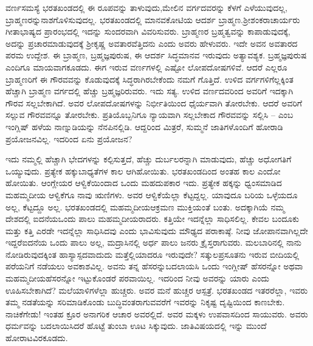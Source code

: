 ವರ್ಣಸಮಸ್ಯೆ ಭರತಖಂಡದಲ್ಲಿ ಈ ರೂಪವನ್ನು ತಾಳುವುದು,\break ಮೇಲಿನ ವರ್ಗದವರನ್ನು ಕೆಳಗೆ ಎಳೆಯುವುದಲ್ಲ, ಬ್ರಾಹ್ಮಣರನ್ನು\break ನಾಶಗೊಳಿಸುವುದಲ್ಲ. ಭರತಖಂಡದಲ್ಲಿ ಮಾನವಕೋಟಿಯ ಆದರ್ಶ ಬ್ರಾಹ್ಮಣ.\break ಶ‍್ರೀಶಂಕರಾಚಾರ್ಯರು ಗೀತಾಭಾಷ್ಯದ ಪ್ರಾರಂಭದಲ್ಲಿ ಇದನ್ನು ಸುಂದರವಾಗಿ ವಿವರಿಸುವರು. ಬ್ರಾಹ್ಮಣರ ಬ್ರಹ್ಮತ್ವವನ್ನು ಕಾಪಾಡುವುದಕ್ಕೆ, ಅದನ್ನು ಪ್ರಚಾರಮಾಡುವುದಕ್ಕೆ ಶ‍್ರೀಕೃಷ್ಣ ಅವತಾರವೆತ್ತಿದನು ಎಂದು ಅವರು ಹೇಳುವರು. ಇದೇ ಅವನ ಅವತಾರದ ಪರಮ ಉದ್ದೇಶ. ಈ ಬ್ರಾಹ್ಮಣ, ಬ್ರಹ್ಮಜ್ಞಪುರುಷ, ಈ ಆದರ್ಶ ಸಿದ್ಧಮಾನವ ಇರುವುದು ಅತ್ಯಾವಶ್ಯಕ. ಬ್ರಹ್ಮಜ್ಞಪುರುಷ ಎಂದಿಗೂ ಮಾಯವಾಗಕೂಡದು. ಈಗ ಇರುವ ವರ್ಣಗಳಲ್ಲಿ ಎಷ್ಟೋ ಲೋಪದೋಷಗಳಿವೆ. ಆದರೆ ಎಲ್ಲರೂ ಬ್ರಾಹ್ಮಣರಿಗೆ ಈ ಗೌರವವನ್ನು ಕೊಡುವುದಕ್ಕೆ ಸಿದ್ಧ\-ರಾಗಿರಬೇಕೆಂದು ನಮಗೆ ಗೊತ್ತಿದೆ. ಉಳಿದ ವರ್ಗಗಳಿಗೆಲ್ಲಕ್ಕಿಂತ ಹೆಚ್ಚಾಗಿ ಬ್ರಾಹ್ಮಣ ವರ್ಗದಲ್ಲಿ ಹೆಚ್ಚು ಬ್ರಹ್ಮಜ್ಞರಿರುವರು. ಇದು ಸತ್ಯ. ಉಳಿದ ವರ್ಣದವರಿಂದ ಅವರಿಗೆ ಇದಕ್ಕಾಗಿ ಗೌರವ ಸಲ್ಲಬೇಕಾಗಿದೆ. ಅವರ ಲೋಪದೋಷಗಳನ್ನು ನಿರ್ಭೀತಿಯಿಂದ ಧೈರ್ಯವಾಗಿ ತೋರಬೇಕು. ಆದರೆ ಅವರಿಗೆ ಸಲ್ಲುವ ಗೌರವವನ್ನೂ ತೋರಬೇಕು.  ಪ್ರತಿಯೊಬ್ಬನಿಗೂ ನ್ಯಾಯವಾಗಿ ಸಲ್ಲಬೇಕಾದ ಗೌರವವನ್ನು ಸಲ್ಲಿಸಿ – ಎಂಬ ಇಂಗ್ಲಿಷ್​ ಹಳೆಯ ನಾಣ್ನುಡಿಯನ್ನು ನೆನಪಿನಲ್ಲಿಡಿ. ಆದ್ದರಿಂದ ಮಿತ್ರರೆ, ಸುಮ್ಮನೆ ಜಾತಿಗಳೊಂದಿಗೆ ಹೋರಾಡಿ ಪ್ರಯೋಜನವಿಲ್ಲ. ಇದರಿಂದ ಏನು ಪ್ರಯೋಜನ?

ಇದು ನಮ್ಮಲ್ಲಿ ಹೆಚ್ಚಾಗಿ ಭೇದಗಳನ್ನು ಕಲ್ಪಿಸುತ್ತದೆ, ಹೆಚ್ಚು ದುರ್ಬಲ\-ರನ್ನಾಗಿ ಮಾಡುವುದು, ಹೆಚ್ಚು ಅಧೋಗತಿಗೆ ಒಯ್ಯುವುದು. ಪ್ರತ್ಯೇಕ ಹಕ್ಕುಬಾಧ್ಯತೆಗಳ ಕಾಲ ಆಗಿಹೋಯಿತು. ಭರತಖಂಡದಿಂದ ಅಂತಹ ಕಾಲ ಎಂದೋ ಹೋಯಿತು. ಆಂಗ್ಲೇಯರ ಆಳ್ವಿಕೆಯಿಂದಾದ ಒಂದು ಮಹದುಪಕಾರ ಇದು. ಪ್ರತ್ಯೇಕ ಹಕ್ಕನ್ನು ಧ್ವಂಸಮಾಡಿದ ಮಹಮ್ಮದೀಯ ಆಳ್ವಿಕೆಗೂ ನಾವು ಋಣಿಗಳು. ಅವರ ಆಳ್ವಿಕೆಯೆಲ್ಲಾ ಕೆಟ್ಟದ್ದಲ್ಲ. ಯಾವುದೂ ಬರಿಯ ಒಳ್ಳೆಯದೂ ಅಲ್ಲ, ಕೆಟ್ಟದ್ದೂ ಅಲ್ಲ. ಭರತಖಂಡದಲ್ಲಿ ಮಹಮ್ಮದೀಯ\break ಆಕ್ರಮಣ ಮುಕ್ತಿಯಂತೆ ಬಂತು. ಅದಕ್ಕಾಗಿಯೆ ನಮ್ಮ ದೇಶದಲ್ಲಿ ಐದನೆಯ\break ಒಂದು ಪಾಲು ಮಹಮ್ಮದೀಯರಾದರು. ಕತ್ತಿಯೇ ಇದನ್ನೆಲ್ಲಾ ಸಾಧಿಸಲಿಲ್ಲ. ಕೇವಲ ಬಂದೂಕು ಮತ್ತು ಕತ್ತಿ ಎರಡೇ ಇದನ್ನೆಲ್ಲಾ ಸಾಧಿಸಿದವು ಎಂದು ಭಾವಿಸುವುದು ಮೌಢ್ಯದ ಪರಾಕಾಷ್ಠೆ. ನೀವು ಜೋಪಾನವಾಗಿಲ್ಲದೇ ಇದ್ದರೆ\break ಐದನೆಯ ಒಂದು ಪಾಲು ಅಲ್ಲ, ಮದ್ರಾಸಿನಲ್ಲಿ ಅರ್ಧ ಪಾಲು ಜನರು ಕ್ರೈಸ್ತರಾಗುವರು. ಮಲಬಾರಿನಲ್ಲಿ ನಾನು ನೋಡಿರುವುದಕ್ಕಿಂತ ಹಾಸ್ಯಾಸ್ಪದವಾದುದು ಮತ್ತೆಲ್ಲಿಯಾದರೂ ಇರುವುದೇ? ಸತ್ಕುಲಪ್ರಸೂತನು ಇರುವ ಬೀದಿಯಲ್ಲಿ ಪರೆಯನಿಗೆ ನಡೆಯಲು ಅವಕಾಶವಿಲ್ಲ. ಅವನು ತನ್ನ ಹೆಸರನ್ನು\break ಬದಲಾಯಸಿ ಒಂದು ಇಂಗ್ಲೀಷ್​ ಹೆಸರನ್ನೋ ಅಥವಾ ಮಹಮ್ಮದೀಯ\break ಹೆಸರನ್ನೋ ಇಟ್ಟುಕೊಂಡರೆ ಪರವಾಯಿಲ್ಲ. ಇದರಿಂದ ನೀವು ಅವರನ್ನು ಯಾರು ಎಂದು ಊಹಿಸಬೇಕಾಗಿದೆ? ಮಲೆಯಾಳಿಗಳೆಲ್ಲಾ ಹುಚ್ಚರು. ಅವರ ಮನೆ ಹುಚ್ಚರ ಆಸ್ಪತ್ರೆ. ಭರತಖಂಡದ ಇತರರೆಲ್ಲಾ, ಇವರು ತಮ್ಮ ನಡತೆಯನ್ನು ಸರಿಮಾಡಿಕೊಂಡು ಬುದ್ಧಿವಂತರಾಗುವವರೆಗೆ ಇವರನ್ನು ನಿಕೃಷ್ಟ ದೃಷ್ಟಿಯಿಂದ ಕಾಣಬೇಕು. ನಾಚಿಕೆಗೇಡು! ಇಂತಹ ಕ್ರೂರ ಅನಾಗರಿಕ ಆಚಾರ ಅವರಲ್ಲಿದೆ. ಅವರ ಮಕ್ಕಳು ಉಪವಾಸದಿಂದ ಸಾಯುವರು. ಅವರು ಧರ್ಮವನ್ನು ಬದಲಾಯಿಸಿದರೆ ಹೊಟ್ಟೆ ತುಂಬಾ ಊಟ ಸಿಕ್ಕುವುದು. ಜಾತಿವಿಷಯದಲ್ಲಿ ಇನ್ನು ಮುಂದೆ ಹೋರಾಟವಿರಕೂಡದು.

